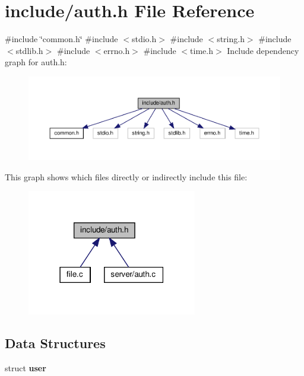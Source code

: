 \section{include/auth.h File Reference}
\label{auth_8h}
{\ttfamily \#include \char`\"{}common.\+h\char`\"{}}\newline
{\ttfamily \#include $<$stdio.\+h$>$}\newline
{\ttfamily \#include $<$string.\+h$>$}\newline
{\ttfamily \#include $<$stdlib.\+h$>$}\newline
{\ttfamily \#include $<$errno.\+h$>$}\newline
{\ttfamily \#include $<$time.\+h$>$}\newline
Include dependency graph for auth.\+h\+:\nopagebreak
\begin{figure}[H]
\begin{center}
\leavevmode
\includegraphics[width=350pt]{auth_8h__incl}
\end{center}
\end{figure}
This graph shows which files directly or indirectly include this file\+:\nopagebreak
\begin{figure}[H]
\begin{center}
\leavevmode
\includegraphics[width=210pt]{auth_8h__dep__incl}
\end{center}
\end{figure}
\subsection*{Data Structures}
\begin{DoxyCompactItemize}
\item 
struct \textbf{ user}
\end{DoxyCompactItemize}
